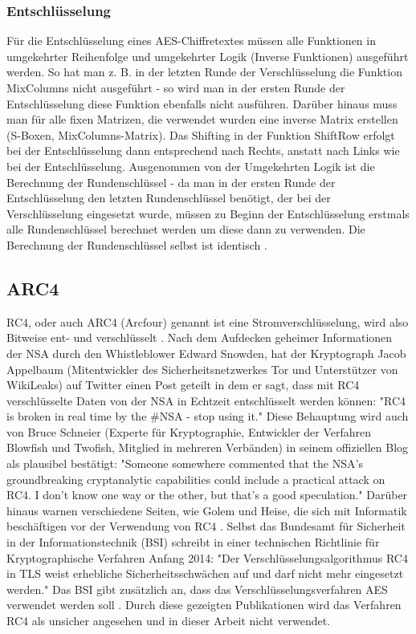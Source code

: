 \documentclass[10pt, a4paper,headsepline]{scrreprt}
\begin{document}
\subsubsection{Entschlüsselung}
Für die Entschlüsselung eines AES-Chiffretextes müssen alle Funktionen in umgekehrter Reihenfolge und umgekehrter Logik (Inverse Funktionen) ausgeführt werden. So hat man z. B. in der letzten Runde der Verschlüsselung die Funktion MixColumns nicht ausgeführt - so wird man in der ersten Runde der Entschlüsselung diese Funktion ebenfalls nicht ausführen. Darüber hinaus muss man für alle fixen Matrizen, die verwendet wurden eine inverse Matrix erstellen (S-Boxen, MixColumns-Matrix). Das Shifting in der Funktion ShiftRow erfolgt bei der Entschlüsselung dann entsprechend nach Rechts, anstatt nach Links wie bei der Entschlüsselung. Ausgenommen von der Umgekehrten Logik ist die Berechnung der Rundenschlüssel - da man in der ersten Runde der Entschlüsselung den letzten Rundenschlüssel benötigt, der bei der Verschlüsselung eingesetzt wurde, müssen zu Beginn der Entschlüsselung erstmals alle Rundenschlüssel berechnet werden um diese dann zu verwenden. Die Berechnung der Rundenschlüssel selbst ist identisch \citep[S. 110ff]{book:understanding-crypto}.



\subsection{ARC4}
RC4, oder auch ARC4 (Arcfour) genannt ist eine Stromverschlüsselung, wird also Bitweise ent- und verschlüsselt \citep[S. 455]{book:angewandte-krypto}.
Nach dem Aufdecken geheimer Informationen der NSA durch den Whistleblower Edward Snowden, hat der Kryptograph Jacob Appelbaum (Mitentwickler des Sicherheitsnetzwerkes Tor und Unterstützer von WikiLeaks) auf Twitter einen Post geteilt in dem er sagt, dass mit RC4 verschlüsselte Daten von der NSA in Echtzeit entschlüsselt werden können: "RC4 is broken in real time by the \#NSA - stop using it." \cite{website:twitter-appelbaum}
Diese Behauptung wird auch von Bruce Schneier (Experte für Kryptographie, Entwickler der Verfahren Blowfish und Twofish, Mitglied in mehreren Verbänden) in seinem offiziellen Blog als plausibel bestätigt: "Someone somewhere commented that the NSA's groundbreaking cryptanalytic capabilities could include a practical attack on RC4. I don't know one way or the other, but that's a good speculation." \cite{website:schneier-breaking-most-enc}
Darüber hinaus warnen verschiedene Seiten, wie Golem und Heise, die sich mit Informatik beschäftigen vor der Verwendung von RC4 \cite{website:heise-nsa, website:golem-rc4, website:theregister-rc4}.
Selbst das Bundesamt für Sicherheit in der Informationstechnik (BSI) schreibt in einer technischen Richtlinie für Kryptographische Verfahren Anfang 2014: "Der Verschlüsselungsalgorithmus RC4 in TLS weist erhebliche Sicherheitsschwächen auf und darf nicht mehr eingesetzt werden." Das BSI gibt zusätzlich an, dass das Verschlüsselungsverfahren AES verwendet werden soll \cite{website:bsi-rc4}.
Durch diese gezeigten Publikationen wird das Verfahren RC4 als unsicher angesehen und in dieser Arbeit nicht verwendet.
\end{document}

